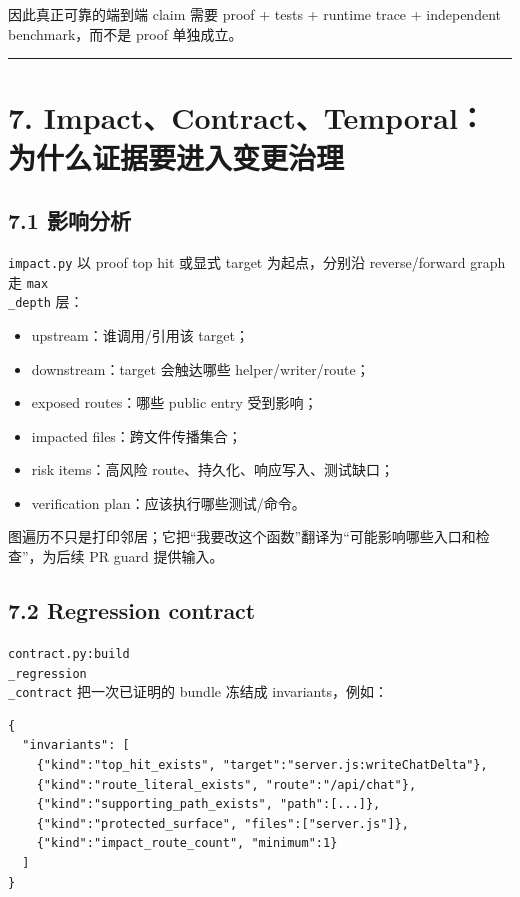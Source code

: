 \documentclass[UTF8,12pt,openany]{ctexbook}
\begin{document}
因此真正可靠的端到端 claim 需要 proof + tests + runtime trace + independent benchmark，而不是 proof 单独成立。\par

\hrule

\section{7. Impact、Contract、Temporal：为什么证据要进入变更治理}

\subsection{7.1 影响分析}

\texttt{impact.py} 以 proof top hit 或显式 target 为起点，分别沿 reverse/forward graph 走 \texttt{max\\_depth} 层：\par

\begin{itemize}
\item upstream：谁调用/引用该 target；
\item downstream：target 会触达哪些 helper/writer/route；
\item exposed routes：哪些 public entry 受到影响；
\item impacted files：跨文件传播集合；
\item risk items：高风险 route、持久化、响应写入、测试缺口；
\item verification plan：应该执行哪些测试/命令。
\end{itemize}

图遍历不只是打印邻居；它把“我要改这个函数”翻译为“可能影响哪些入口和检查”，为后续 PR guard 提供输入。\par

\subsection{7.2 Regression contract}

\texttt{contract.py:build\\_regression\\_contract} 把一次已证明的 bundle 冻结成 invariants，例如：\par

\begin{lstlisting}
{
  "invariants": [
    {"kind":"top_hit_exists", "target":"server.js:writeChatDelta"},
    {"kind":"route_literal_exists", "route":"/api/chat"},
    {"kind":"supporting_path_exists", "path":[...]},
    {"kind":"protected_surface", "files":["server.js"]},
    {"kind":"impact_route_count", "minimum":1}
  ]
}
\end{lstlisting}
\end{document}
